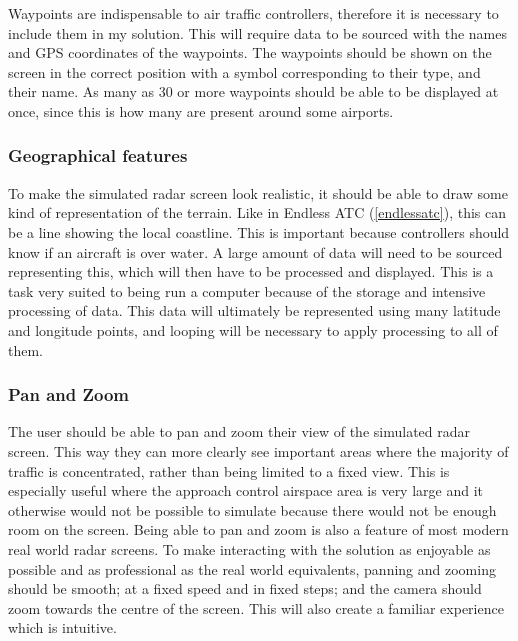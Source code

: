 \documentclass{article}
\begin{document}
Waypoints are indispensable to air traffic controllers, therefore it is necessary to include them in my solution.
This will require data to be sourced with the names and GPS coordinates of the waypoints.
The waypoints should be shown on the screen in the correct position with a symbol corresponding to their type, and their name.
As many as 30 or more waypoints should be able to be displayed at once, since this is how many are present around some airports.


\subsubsection{Geographical features}
To make the simulated radar screen look realistic, it should be able to draw some kind of representation of the terrain.
Like in Endless ATC (\ref{endlessatc}), this can be a line showing the local coastline.
This is important because controllers should know if an aircraft is over water.
A large amount of data will need to be sourced representing this, which will then have to be processed and displayed.
This is a task very suited to being run a computer because of the storage and intensive processing of data.
This data will ultimately be represented using many latitude and longitude points, and looping will be necessary to apply processing to all of them.

\subsubsection{Pan and Zoom}
The user should be able to pan and zoom their view of the simulated radar screen.
This way they can more clearly see important areas where the majority of traffic is concentrated, rather than being limited to a fixed view.
This is especially useful where the approach control airspace area is very large and it otherwise would not be possible to simulate because there would not be enough room on the screen.
Being able to pan and zoom is also a feature of most modern real world radar screens.
To make interacting with the solution as enjoyable as possible and as professional as the real world equivalents, panning and zooming should be smooth; at a fixed speed and in fixed steps; and the camera should zoom towards the centre of the screen.
This will also create a familiar experience which is intuitive.
\end{document}
